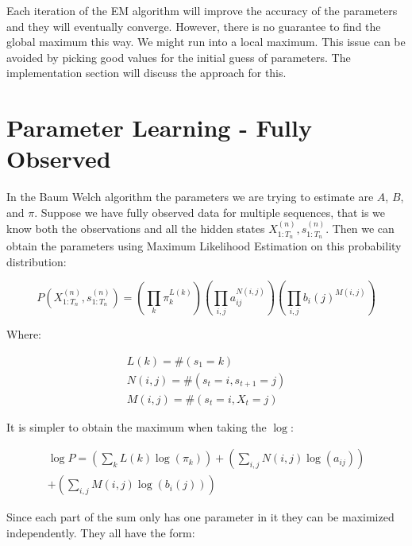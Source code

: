 Each iteration of the EM algorithm will improve the accuracy of the parameters and they will eventually converge. However, there is no guarantee to find the global maximum this way. We might run into a local maximum. This issue can be avoided by picking good values for the initial guess of parameters. The implementation section will discuss the approach for this.

\section{Parameter Learning - Fully Observed}

In the Baum Welch algorithm the parameters we are trying to estimate are $A$, $B$, and $\pi$. Suppose we have fully observed data for multiple sequences, that is we know both the observations and all the hidden states $X_{1: T_{n}}^{(n)}, s_{1: T_{n}}^{(n)}$. Then we can obtain the parameters using Maximum Likelihood Estimation on this probability distribution:


\begin{equation}
  P(X_{1: T_{n}}^{(n)}, s_{1: T_{n}}^{(n)})=\left(\prod_{k} \pi_{k}^{L(k)}\right)\left(\prod_{i, j} a_{i j}^{N(i, j)}\right)\left(\prod_{i, j} b_{i}(j)^{M(i, j)}\right) 
\end{equation}

Where:

\begin{equation}
  \begin{array}{c}
L(k)=\#\left(s_{1}=k\right) \\
N(i, j)=\#\left(s_{t}=i, s_{t+1}=j\right) \\
M(i, j)=\#\left(s_{t}=i, X_{t}=j\right)
\end{array} 
\end{equation}

It is simpler to obtain the maximum when taking the $\log$:

\begin{equation}
\begin{split}
  \log P=\left(\sum_{k} L(k) \log \left(\pi_{k}\right)\right)+\left(\sum_{i, j} N(i, j) \log \left(a_{i j}\right)\right)  \\
   +\left(\sum_{i, j} M(i, j) \log \left(b_{i}(j)\right)\right) 
\end{split}
\end{equation}

Since each part of the sum only has one parameter in it they can be maximized independently. They all have the form: 


